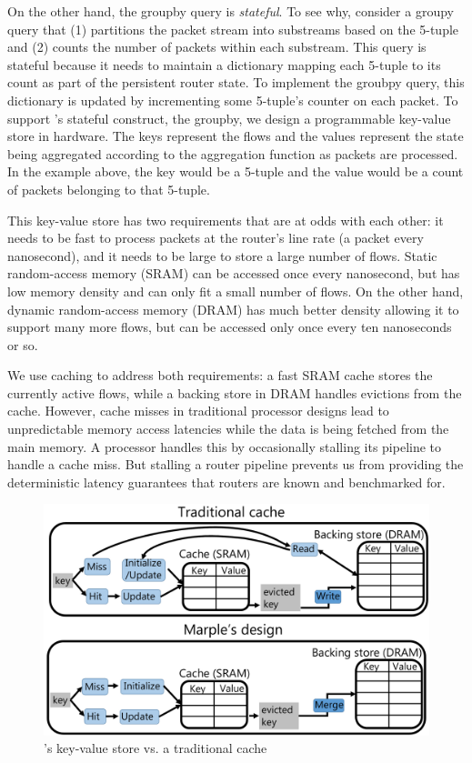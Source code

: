 On the other hand, the {\ct groupby} query is {\em stateful}. To see why,
consider a {\ct groupy} query that (1) partitions the packet stream into
substreams based on the 5-tuple and (2) counts the number of packets within
each substream. This query is stateful because it needs to maintain a
dictionary mapping each 5-tuple to its count as part of the persistent router
state. To implement the {\ct groubpy} query, this dictionary is updated by
incrementing some 5-tuple's counter on each packet. To support \TheSystem's
stateful construct, the {\ct groupby}, we design a programmable key-value store
in hardware. The keys represent the flows and the values represent the state
being aggregated according to the aggregation function as packets are
processed. In the example above, the key would be a 5-tuple and the value would
be a count of packets belonging to that 5-tuple.

This key-value store has two requirements that are at odds with each other: it
needs to be fast to process packets at the router's line rate (a packet every
nanosecond), and it needs to be large to store a large number of flows. Static
random-access memory (SRAM) can be accessed once every nanosecond, but has low
memory density and can only fit a small number of flows. On the other hand,
dynamic random-access memory (DRAM) has much better density allowing it to
support many more flows, but can be accessed only once every ten nanoseconds or
so.

We use caching to address both requirements: a fast SRAM cache stores the
currently active flows, while a backing store in DRAM handles evictions from
the cache. However, cache misses in traditional processor designs lead to
unpredictable memory access latencies while the data is being fetched from the
main memory. A processor handles this by occasionally stalling its pipeline to
handle a cache miss. But stalling a router pipeline prevents us from providing
the deterministic latency guarantees that routers are known and benchmarked
for.

\begin{figure}
\centering
\includegraphics[width=0.6\columnwidth]{pq_kv_store.pdf}
\caption{\TheSystem's key-value store vs. a traditional cache}
\label{fig:hw_diff}
\end{figure}

